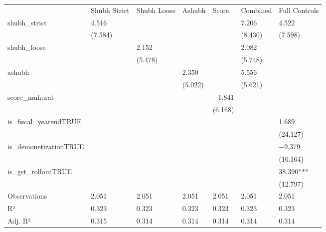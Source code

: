 \begin{tabular}{lllllll}
& Shubh Strict & Shubh Loose & Ashubh & Score & Combined & Full Controls \\
shubh\_strict & \num{4.516} &  &  &  & \num{7.206} & \num{4.522} \\
& (\num{7.584}) &  &  &  & (\num{8.430}) & (\num{7.598}) \\
shubh\_loose &  & \num{2.152} &  &  & \num{2.082} &  \\
&  & (\num{5.478}) &  &  & (\num{5.748}) &  \\
ashubh &  &  & \num{2.350} &  & \num{5.556} &  \\
&  &  & (\num{5.022}) &  & (\num{5.621}) &  \\
score\_muhurat &  &  &  & \num{-1.841} &  &  \\
&  &  &  & (\num{6.168}) &  &  \\
is\_fiscal\_yearendTRUE &  &  &  &  &  & \num{1.689} \\
&  &  &  &  &  & (\num{24.127}) \\
is\_demonetizationTRUE &  &  &  &  &  & \num{-9.379} \\
&  &  &  &  &  & (\num{16.164}) \\
is\_gst\_rolloutTRUE &  &  &  &  &  & \num{38.390}*** \\
&  &  &  &  &  & (\num{12.797}) \\
Observations & \num{2,051} & \num{2,051} & \num{2,051} & \num{2,051} & \num{2,051} & \num{2,051} \\
R² & \num{0.323} & \num{0.323} & \num{0.323} & \num{0.323} & \num{0.323} & \num{0.323} \\
Adj. R² & \num{0.315} & \num{0.314} & \num{0.314} & \num{0.314} & \num{0.314} & \num{0.314} \\
\end{tabular}
